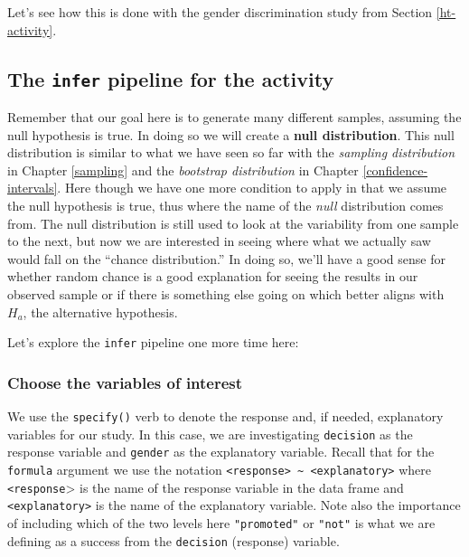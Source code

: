 \documentclass[12pt, krantz2,]{krantz}
\begin{document}
Let's see how this is done with the gender discrimination study from Section \ref{ht-activity}.

\hypertarget{the-infer-pipeline-for-the-activity}{%
\subsection{\texorpdfstring{The \texttt{infer} pipeline for the activity}{The infer pipeline for the activity}}\label{the-infer-pipeline-for-the-activity}}

Remember that our goal here is to generate many different samples, assuming the null hypothesis is true. In doing so we will create a \textbf{null distribution}. This null distribution is similar to what we have seen so far with the \emph{sampling distribution} in Chapter \ref{sampling} and the \emph{bootstrap distribution} in Chapter \ref{confidence-intervals}. Here though we have one more condition to apply in that we assume the null hypothesis is true, thus where the name of the \emph{null} distribution comes from. The null distribution is still used to look at the variability from one sample to the next, but now we are interested in seeing where what we actually saw would fall on the ``chance distribution.'' In doing so, we'll have a good sense for whether random chance is a good explanation for seeing the results in our observed sample or if there is something else going on which better aligns with \(H_a\), the alternative hypothesis.

Let's explore the \texttt{infer} pipeline one more time here:

\hypertarget{choose-the-variables-of-interest}{%
\subsubsection*{Choose the variables of interest}\label{choose-the-variables-of-interest}}


We use the \texttt{specify()} verb to denote the response and, if needed, explanatory variables for our study. In this case, we are investigating \texttt{decision} as the response variable and \texttt{gender} as the explanatory variable. Recall that for the \texttt{formula} argument we use the notation \texttt{\textless{}response\textgreater{}\ \textasciitilde{}\ \textless{}explanatory\textgreater{}} where \texttt{\textless{}response}\textgreater{} is the name of the response variable in the data frame and \texttt{\textless{}explanatory\textgreater{}} is the name of the explanatory variable. Note also the importance of including which of the two levels here \texttt{"promoted"} or \texttt{"not"} is what we are defining as a success from the \texttt{decision} (response) variable.
\end{document}
